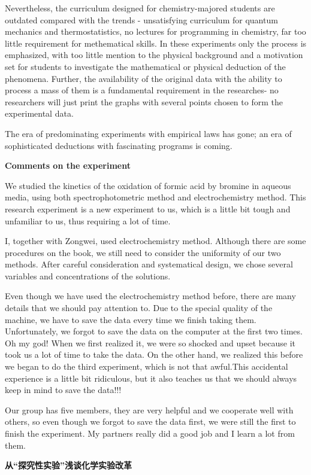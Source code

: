 \documentclass[%
preprint,
 amsmath,amssymb,
 aps,
10.5pt,
]{revtex4-1}
\newcommand{\xiaosan}{\fontsize{15pt}{22pt}\selectfont}    %
\newcommand{\xiaosi}{\fontsize{12pt}{18pt}\selectfont}
\begin{document}
Nevertheless, the curriculum designed for chemistry-majored students are outdated compared with the trends - unsatisfying curriculum for quantum mechanics and thermostatistics, no lectures for programming in chemistry, far too little requirement for methematical skills. In these experiments only the process is emphasized, with too little mention to the physical background and a motivation set for students to investigate the mathematical or physical deduction of the phenomena. Further, the availability of the original data with the ability to process a mass of them is a fundamental requirement in the researches- no researchers will just print the graphs with several points chosen to form the experimental data.

The era of predominating experiments with empirical laws has gone; an era of sophisticated deductions with fascinating programs is coming.


\newpage
\begin{center}
\xiaosan\textbf{Comments on the experiment}

\xiaosi{Yiliu Li}
\end{center}
We studied the kinetics of the oxidation of formic acid by bromine in aqueous media, using both spectrophotometric method and electrochemistry method. This research experiment is a new experiment to us, which is a little bit tough and unfamiliar to us, thus requiring a lot of time.

I, together with Zongwei, used electrochemistry method. Although there are some procedures on the book, we still need to consider the uniformity of our two methods. After careful consideration and systematical design, we chose several variables and concentrations of the solutions. 

Even though we have used the electrochemistry method before, there are many details that we should pay attention to. Due to the special quality of the machine, we have to save the data every time we finish taking them. Unfortunately, we forgot to save the data on the computer at the first two times. Oh my god! When we first realized it, we were so shocked and upset because it took us a lot of time to take the data. On the other hand, we realized this before we began to do the third experiment, which is not that awful.This accidental experience is a little bit ridiculous, but it also teaches us that we should always keep in mind to save the data!!!

Our group has five members, they are very helpful and we cooperate well with others, so even though we forgot to save the data first, we were still the first to finish the experiment. My partners really did a good job and I learn a lot from them.
\newpage
\begin{center}
\xiaosan\textbf{从``探究性实验''浅谈化学实验改革}

\xiaosi{ 黄宗玮 （3160104940）}
\end{center}
\end{document}
